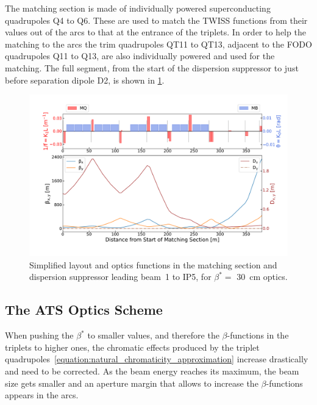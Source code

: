 The matching section is made of individually powered superconducting quadrupoles Q\num{4} to Q\num{6}.
These are used to match the TWISS functions from their values out of the arcs to that at the entrance of the triplets.
In order to help the matching to the arcs the trim quadrupoles QT\num{11} to QT\num{13}, adjacent to the FODO quadrupoles Q\num{11} to Q\num{13}, are also individually powered and used for the matching.
The full segment, from the start of the dispersion suppressor to just before separation dipole D\num{2}, is shown in \cref{figure:lhc_matching_section}.

\begin{figure}[!hbt]
  \centering
  \includegraphics*[width=0.99\linewidth]{Figures/Optics_Measurements_Corrections_at_LHC/lhc_matching_section.pdf}
  \caption{Simplified layout and optics functions in the matching section and dispersion suppressor leading beam~\num{1} to IP\num{5}, for \(\beta^{\ast} =\) \qty{30}{\centi\meter} optics.}
  \label{figure:lhc_matching_section}
\end{figure}

\subsection{The ATS Optics Scheme}
\label{subsection:lhc_ats_optics_scheme}

When pushing the \(\beta^{\ast}\) to smaller values, and therefore the \(\beta\)-functions in the triplets to higher ones, the chromatic effects produced by the triplet quadrupoles~\cref{equation:natural_chromaticity_approximation} increase drastically and need to be corrected.
As the beam energy reaches its maximum, the beam size gets smaller and an aperture margin that allows to increase the \(\beta\)-functions appears in the arcs.

